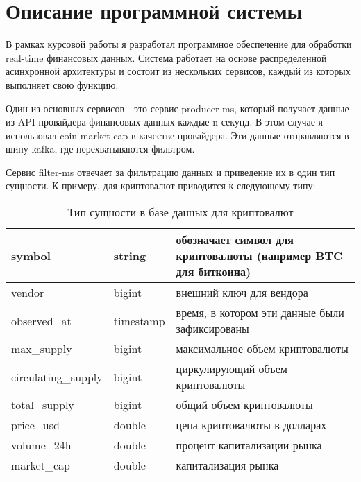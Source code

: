\section{Описание программной системы}

В рамках курсовой работы я разработал программное обеспечение для
обработки real-time финансовых данных. Система работает на основе
распределенной асинхронной архитектуры и состоит из нескольких сервисов, каждый
из которых выполняет свою функцию.

Один из основных сервисов - это сервис producer-ms, который получает данные из
API провайдера финансовых данных каждые n секунд. В этом случае я использовал
coin market cap в качестве провайдера. Эти данные отправляются в шину kafka, где
перехватываются фильтром.

Сервис filter-ms отвечает за фильтрацию данных и приведение их в один тип
сущности.
К примеру, для криптовалют приводится к следующему типу:

\begin{table}[h!]
    \caption{Тип сущности в базе данных для криптовалют}
    \begin{center}
        \begin{tabular}{|l|l|p{9cm}|}
            \hline
            symbol              & string    & обозначает символ для криптовалюты (например BTC для биткоина) \\
            \hline
            vendor              & bigint    & внешний ключ для вендора                                       \\
            \hline
            observed\_at        & timestamp & время, в котором эти данные были зафиксированы                 \\
            \hline
            max\_supply         & bigint    & максимальное объем криптовалюты                                \\
            \hline
            circulating\_supply & bigint    & циркулирующий объем криптовалюты                               \\
            \hline
            total\_supply       & bigint    & общий объем криптовалюты                                       \\
            \hline
            price\_usd          & double    & цена криптовалюты в долларах                                   \\
            \hline
            volume\_24h         & double    & процент капитализации рынка                                    \\
            \hline
            market\_cap         & double    & капитализация рынка                                            \\
            \hline
        \end{tabular}
    \end{center}
\end{table}

